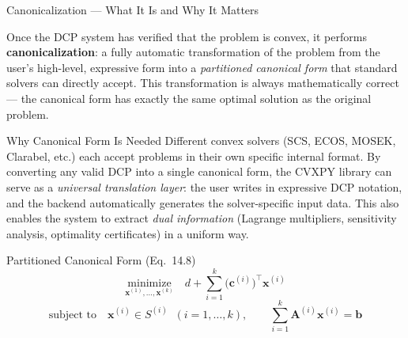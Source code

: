 \documentclass[aspectratio=169,10pt]{beamer}
\begin{document}
\begin{frame}[allowframebreaks]{Canonicalization --- What It Is and Why It Matters}

  Once the DCP system has verified that the problem is convex, it
  performs \textbf{canonicalization}: a fully automatic transformation
  of the problem from the user's high-level, expressive form into a
  \emph{partitioned canonical form} that standard solvers can directly
  accept.  This transformation is always mathematically correct ---
  the canonical form has exactly the same optimal solution as the
  original problem.

  \begin{block}{Why Canonical Form Is Needed}
    Different convex solvers (SCS, ECOS, MOSEK, Clarabel, etc.) each
    accept problems in their own specific internal format.  By converting
    any valid DCP into a single canonical form, the CVXPY library can
    serve as a \emph{universal translation layer}: the user writes in
    expressive DCP notation, and the backend automatically generates the
    solver-specific input data.  This also enables the system to extract
    \emph{dual information} (Lagrange multipliers, sensitivity analysis,
    optimality certificates) in a uniform way.
  \end{block}

  \begin{block}{Partitioned Canonical Form (Eq.\ 14.8)}
    \[
      \underset{\mathbf{x}^{(1)},\ldots,\mathbf{x}^{(k)}}
      {\mathrm{minimize}}\quad
      d + \sum_{i=1}^{k}\bigl(\mathbf{c}^{(i)}\bigr)^{\top}\mathbf{x}^{(i)}
    \]
    \[
      \text{subject to}\quad
      \mathbf{x}^{(i)} \in S^{(i)}\;\;(i=1,\ldots,k),\qquad
      \sum_{i=1}^{k}\mathbf{A}^{(i)}\mathbf{x}^{(i)} = \mathbf{b}
    \]
  \end{block}


\end{frame}
\end{document}
